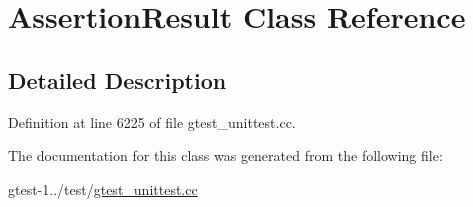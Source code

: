 \hypertarget{classmy__namespace_1_1testing_1_1AssertionResult}{\section{\-Assertion\-Result \-Class \-Reference}
\label{d0/daa/classmy__namespace_1_1testing_1_1AssertionResult}
}


\subsection{\-Detailed \-Description}


\-Definition at line 6225 of file gtest\-\_\-unittest.\-cc.



\-The documentation for this class was generated from the following file\-:\begin{DoxyCompactItemize}
\item 
gtest-\/1../test/\hyperlink{gtest__unittest_8cc}{gtest\-\_\-unittest.\-cc}\end{DoxyCompactItemize}
